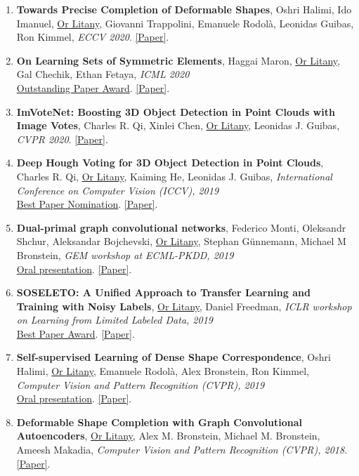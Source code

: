 \begin{enumerate}[leftmargin=*]
    \item \textbf{Towards Precise Completion of Deformable Shapes}, Oshri Halimi, Ido Imanuel, \underline{Or Litany}, Giovanni Trappolini, Emanuele Rodolà, Leonidas Guibas, Ron Kimmel, \textit{ECCV 2020}. \href{https://arxiv.org/abs/2001.09650}{[Paper]}.
    \item \textbf{On Learning Sets of Symmetric Elements}, Haggai Maron, \underline{Or Litany}, Gal Chechik, Ethan Fetaya, \textit{ICML 2020}\\ \underline{Outstanding Paper Award}. \href{https://arxiv.org/abs/2002.08599}{[Paper]}.
    \item \textbf{ImVoteNet: Boosting 3D Object Detection in Point Clouds with Image Votes}, Charles R. Qi, Xinlei Chen, \underline{Or Litany}, Leonidas J. Guibas, \textit{CVPR 2020}. \href{https://arxiv.org/abs/2001.10692}{[Paper]}.
    \item \textbf{Deep Hough Voting for 3D Object Detection in Point Clouds}, Charles R. Qi, \underline{Or Litany}, Kaiming He, Leonidas J. Guibas, \textit{International Conference on Computer Vision (ICCV), 2019}\\ \underline{Best Paper Nomination}. \href{https://arxiv.org/pdf/1904.09664.pdf}{[Paper]}.
    \item \textbf{Dual-primal graph convolutional networks}, Federico Monti, Oleksandr Shchur, Aleksandar Bojchevski, \underline{Or Litany}, Stephan Günnemann, Michael M Bronstein, \textit{GEM workshop at ECML-PKDD, 2019}\\ \underline{Oral presentation}. \href{https://arxiv.org/pdf/1806.00770.pdf}{[Paper]}.
    \item \textbf{SOSELETO: A Unified Approach to Transfer Learning and Training with Noisy Labels}, \underline{Or Litany}, Daniel Freedman, \textit{ICLR workshop on Learning from Limited Labeled Data, 2019}\\ \underline{Best Paper Award}. \href{https://arxiv.org/pdf/1805.09622.pdf}{[Paper]}.
    \item \textbf{Self-supervised Learning of Dense Shape Correspondence}, Oshri Halimi, \underline{Or Litany}, Emanuele Rodolà, Alex Bronstein, Ron Kimmel, \textit{Computer Vision and Pattern Recognition (CVPR), 2019}\\ \underline{Oral presentation}. \href{https://arxiv.org/pdf/1812.02415.pdf}{[Paper]}.
    \item \textbf{Deformable Shape Completion with Graph Convolutional Autoencoders}, \underline{Or Litany}, Alex M. Bronstein, Michael M. Bronstein, Ameesh Makadia, \textit{Computer Vision and Pattern Recognition (CVPR), 2018}. \href{https://arxiv.org/pdf/1712.00268v1.pdf}{[Paper]}.

\end{enumerate}
